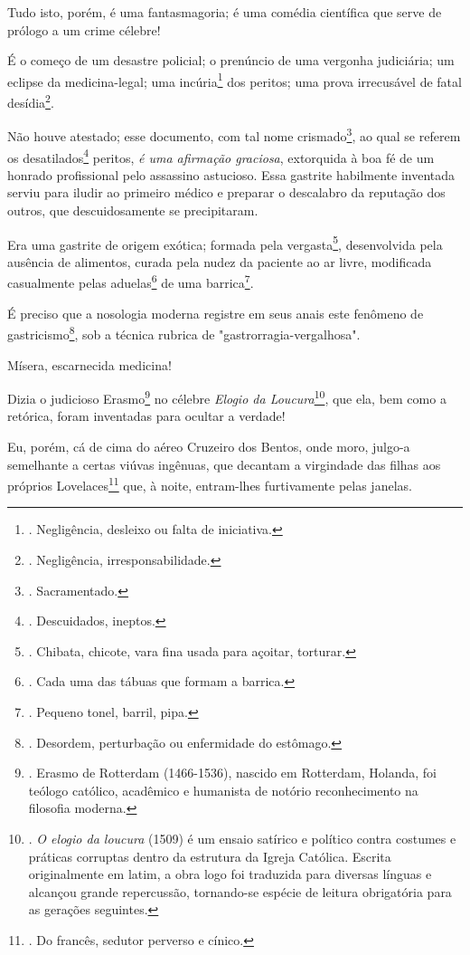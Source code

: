 Tudo isto, porém, é uma fantasmagoria; é uma comédia científica que
serve de prólogo a um crime célebre!

É o começo de um desastre policial; o prenúncio de uma vergonha
judiciária; um eclipse da medicina-legal; uma incúria\footnote{.
  Negligência, desleixo ou falta de iniciativa.} dos peritos; uma prova
irrecusável de fatal desídia\footnote{. Negligência, irresponsabilidade.}.

Não houve atestado; esse documento, com tal nome crismado\footnote{.
  Sacramentado.}, ao qual se referem os desatilados\footnote{.
  Descuidados, ineptos.} peritos, \emph{é uma afirmação graciosa},
extorquida à boa fé de um honrado profissional pelo assassino astucioso.
Essa gastrite habilmente inventada serviu para iludir ao primeiro médico
e preparar o descalabro da reputação dos outros, que descuidosamente se
precipitaram.

Era uma gastrite de origem exótica; formada pela vergasta\footnote{.
  Chibata, chicote, vara fina usada para açoitar, torturar.},
desenvolvida pela ausência de alimentos, curada pela nudez da paciente
ao ar livre, modificada casualmente pelas aduelas\footnote{. Cada uma
  das tábuas que formam a barrica.} de uma barrica\footnote{. Pequeno
  tonel, barril, pipa.}.

É preciso que a nosologia moderna registre em seus anais este fenômeno
de gastricismo\footnote{. Desordem, perturbação ou enfermidade do
  estômago.}, sob a técnica rubrica de "gastrorragia-vergalhosa".

Mísera, escarnecida medicina!

Dizia o judicioso Erasmo\footnote{. Erasmo de Rotterdam (1466-1536),
  nascido em Rotterdam, Holanda, foi teólogo católico, acadêmico e
  humanista de notório reconhecimento na filosofia moderna.} no célebre
\emph{Elogio da Loucura}\footnote{. \emph{O elogio da loucura} (1509) é
  um ensaio satírico e político contra costumes e práticas corruptas
  dentro da estrutura da Igreja Católica. Escrita originalmente em
  latim, a obra logo foi traduzida para diversas línguas e alcançou
  grande repercussão, tornando-se espécie de leitura obrigatória para as
  gerações seguintes.}, que ela, bem como a retórica, foram inventadas
para ocultar a verdade!

Eu, porém, cá de cima do aéreo Cruzeiro dos Bentos, onde moro, julgo-a
semelhante a certas viúvas ingênuas, que decantam a virgindade das
filhas aos próprios Lovelaces\footnote{. Do francês, sedutor perverso e
  cínico.} que, à noite, entram-lhes furtivamente pelas janelas.


